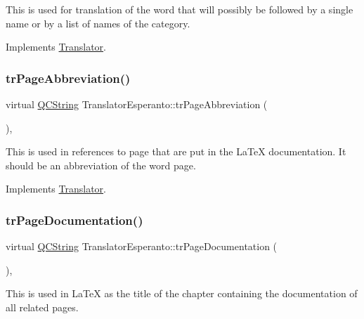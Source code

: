 This is used for translation of the word that will possibly be followed by a single name or by a list of names of the category. 

Implements \mbox{\hyperlink{class_translator}{Translator}}.

\mbox{\label{class_translator_esperanto_adc33adbd7cddcd25afc66c69d8742c0d}} 
\subsubsection{\texorpdfstring{trPageAbbreviation()}{trPageAbbreviation()}}
{\footnotesize\ttfamily virtual \mbox{\hyperlink{class_q_c_string}{Q\+C\+String}} Translator\+Esperanto\+::tr\+Page\+Abbreviation (\begin{DoxyParamCaption}{ }\end{DoxyParamCaption})\hspace{0.3cm}{\ttfamily [inline]}, {\ttfamily [virtual]}}

This is used in references to page that are put in the La\+TeX documentation. It should be an abbreviation of the word page. 

Implements \mbox{\hyperlink{class_translator}{Translator}}.

\mbox{\label{class_translator_esperanto_ae3b6cbd8c76375692cc9a4ec3b33ace8}} 
\subsubsection{\texorpdfstring{trPageDocumentation()}{trPageDocumentation()}}
{\footnotesize\ttfamily virtual \mbox{\hyperlink{class_q_c_string}{Q\+C\+String}} Translator\+Esperanto\+::tr\+Page\+Documentation (\begin{DoxyParamCaption}{ }\end{DoxyParamCaption})\hspace{0.3cm}{\ttfamily [inline]}, {\ttfamily [virtual]}}

This is used in La\+TeX as the title of the chapter containing the documentation of all related pages. 


